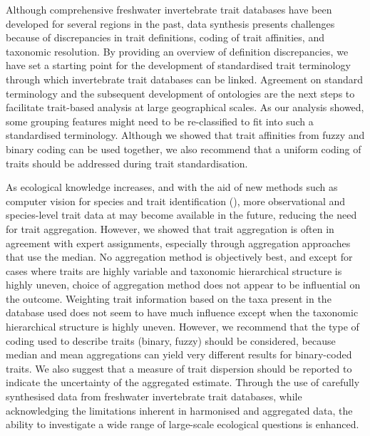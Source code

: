\documentclass{article}
\begin{document}
Although comprehensive freshwater invertebrate trait databases have been developed for several regions in the past, data synthesis presents challenges because of discrepancies in trait definitions, coding of trait affinities, and taxonomic resolution. By providing an overview of definition discrepancies, we have set a starting point for the development of standardised trait terminology through which invertebrate trait databases can be linked. Agreement on standard terminology and the subsequent development of ontologies are the next steps to facilitate trait-based analysis at large geographical scales. As our analysis showed, some grouping features might need to be re-classified to fit into such a standardised terminology. Although we showed that trait affinities from fuzzy and binary coding can be used together, we also recommend that a uniform coding of traits should be addressed during trait standardisation. 

As ecological knowledge increases, and with the aid of new  methods such as computer vision for species and trait identification (\cite{hoye_deep_2020}), more observational and species-level trait data at may become available in the future, reducing the need for trait aggregation. However, we showed that trait aggregation is often in agreement with expert assignments, especially through aggregation approaches that use the median. No aggregation method is objectively best, and except for cases where traits are highly variable and taxonomic hierarchical structure is highly uneven, choice of aggregation method does not appear to be influential on the outcome. Weighting trait information based on the taxa present in the database used does not seem to have much influence except when the taxonomic hierarchical structure is highly uneven. However, we recommend that the type of coding used to describe traits (binary, fuzzy) should be considered, because median and mean aggregations can yield very different results for binary-coded traits. We also suggest that a measure of trait dispersion should be reported to indicate the uncertainty of the aggregated estimate. Through the use of carefully synthesised data from freshwater invertebrate trait databases, while acknowledging the limitations inherent in harmonised and aggregated data, the ability to investigate a wide range of large-scale ecological questions is enhanced.
\end{document}
